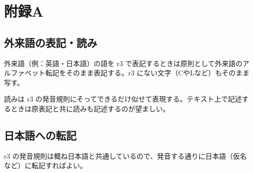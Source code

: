 \chapter{附録A}

\section{外来語の表記・読み}

外来語（例：英語・日本語）の語を r3 で表記するときは原則として外来語のアルファベット転記をそのまま表記する。r3 にない文字（CやLなど）もそのまま写す。

読みは r3 の発音規則にそってできるだけ似せて表現する。テキスト上で記述するときは原表記と共に読みも記述するのが望ましい。

\section{日本語への転記}

r3 の発音規則は概ね日本語と共通しているので、発音する通りに日本語（仮名など）に転記すればよい。